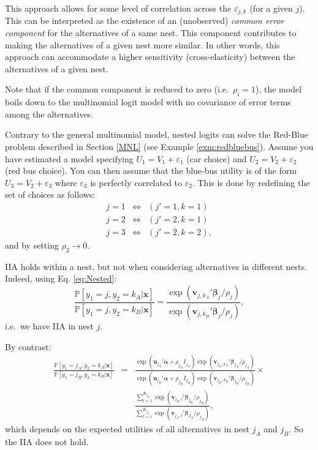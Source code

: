 \documentclass[
  12pt,
]{book}
\theoremstyle{definition}
\theoremstyle{definition}
\theoremstyle{definition}
\theoremstyle{definition}
\theoremstyle{remark}
\begin{document}
This approach allows for some level of correlation across the \(\varepsilon_{j,k}\) (for a given \(j\)). This can be interpreted as the existence of an (unobserved) \emph{common error component} for the alternatives of a same nest. This component contributes to making the alternatives of a given nest more similar. In other words, this approach can accommodate a higher sensitivity (cross-elasticity) between the alternatives of a given nest.

Note that if the common component is reduced to zero (i.e.~\(\rho_i=1\)), the model boils down to the multinomial logit model with no covariance of error terms among the alternatives.

Contrary to the general multinomial model, nested logits can solve the Red-Blue problem described in Section \ref{MNL} (see Example \ref{exm:redbluebus}). Assume you have estimated a model specifying \(U_{1} = V_{1} + \varepsilon_{1}\) (car choice) and \(U_{2} = V_{2} + \varepsilon_{2}\) (red bus choice). You can then assume that the blue-bus utility is of the form \(U_{3} = V_{2} + \varepsilon_{3}\) where \(\varepsilon_{3}\) is perfectly correlated to \(\varepsilon_{2}\). This is done by redefining the set of choices as follows:
\begin{eqnarray*}
j=1 &\Leftrightarrow& (j'=1,k=1) \\
j=2 &\Leftrightarrow& (j'=2,k=1) \\
j=3 &\Leftrightarrow& (j'=2,k=2),
\end{eqnarray*}
and by setting \(\rho_2 \rightarrow 0\).

IIA holds within a nest, but not when considering alternatives in different nests. Indeed, using Eq. \eqref{eq:Nested}:
\[
\frac{\mathbb{P}[y_1=j,y_2=k_A|\mathbf{x}] }{\mathbb{P}[y_1=j,y_2=k_B|\mathbf{x}]} = \frac{\exp(\mathbf{v}_{j,k_A}'\boldsymbol\beta_j/\rho_j)}{\exp(\mathbf{v}_{j,k_B}'\boldsymbol\beta_j/\rho_j)},
\]
i.e.~we have IIA in nest \(j\).

By contrast:
\begin{eqnarray*}
\frac{\mathbb{P}[y_1=j_A,y_2=k_A|\mathbf{x}] }{\mathbb{P}[y_1=j_B,y_2=k_B|\mathbf{x}]} &=& \frac{\exp(\mathbf{u}_{j_A}'\boldsymbol\alpha + \rho_{j_A} I_{j_A})\exp(\mathbf{v}_{{j_A},{k_A}}'\boldsymbol\beta_{j_A}/\rho_{j_A})}{\exp(\mathbf{u}_{j_B}'\boldsymbol\alpha + \rho_{j_B} I_{j_B})\exp(\mathbf{v}_{{j_B},{k_B}}'\boldsymbol\beta_{j_B}/\rho_{j_B})}\times\\
&& \frac{\sum_{l=1}^{K_{j_B}} \exp(\mathbf{v}_{{j_B},l}'\boldsymbol\beta_{j_B}/\rho_{j_B})}{\sum_{l=1}^{K_{j_A}} \exp(\mathbf{v}_{{j_A},l}'\boldsymbol\beta_{J_A}/\rho_{j_A})},
\end{eqnarray*}
which depends on the expected utilities of all alternatives in nest \(j_A\) and \(j_B\). So the IIA does not hold.
\end{document}

